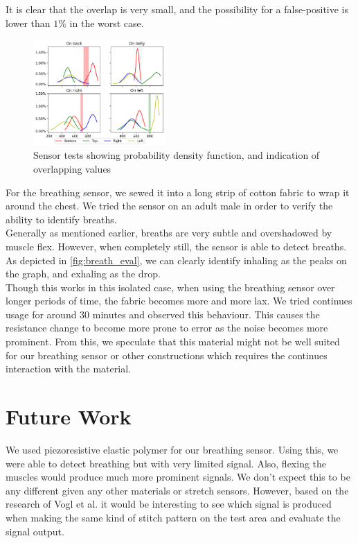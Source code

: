 \documentclass{sigchi-ext}
\begin{document}
It is clear that the overlap is very small, and the possibility for a false-positive is lower than $1\%$ in the worst case.
\begin{figure}
   \centering \includegraphics[width=0.45\textwidth]{img/sensor_test}
    \caption{Sensor tests showing probability density function, and indication of overlapping values}
    \label{fig:testsensorsgraph}
\end{figure}

For the breathing sensor, we sewed it into
a long strip of cotton fabric to wrap it around the chest. We tried the sensor on an 
adult male in order to verify the ability to identify 
breaths.\\
Generally as mentioned earlier, breaths are very subtle and
overshadowed by muscle flex. However, when completely still,
the sensor is able to detect breaths. As depicted in \autoref{fig:breath_eval},
we can clearly identify inhaling as the peaks on the graph, and exhaling as
the drop.\\
Though this works in this isolated case, when using the breathing sensor
over longer periods of time, the fabric becomes more and more lax. We 
tried continues usage for around 30 minutes and observed this behaviour. This causes the resistance
change to become more prone to error as the noise becomes more prominent. From this, we speculate
that this material might not be well suited for our breathing sensor or other constructions which
requires the continues interaction with the material.

\section{Future Work}
We used piezoresistive elastic polymer for our breathing sensor. Using this,
we were able to detect breathing but with very limited signal. Also, flexing the muscles
would produce much more prominent signals. We don't expect this to be any
different given any other materials or stretch sensors. However,
based on the research of Vogl et al. \cite{stretcheband} it would be interesting
to see which signal is produced when making the same kind of stitch pattern on
the test area and evaluate the signal output.
\end{document}
